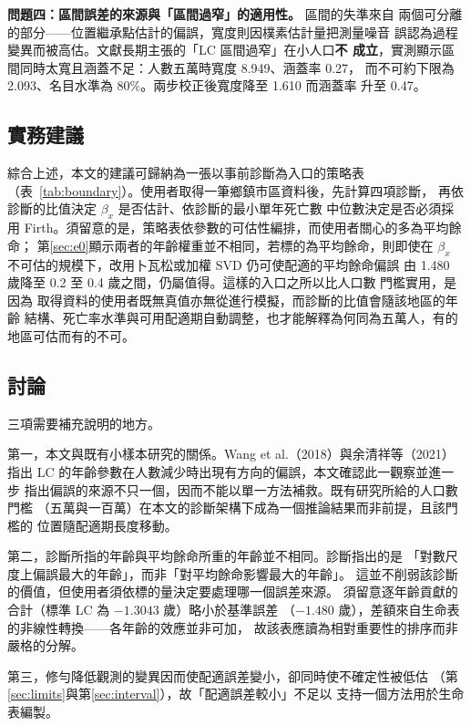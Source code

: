 \documentclass[UTF8, fontset=macnew, a4paper, 12pt]{ctexart}
\newcommand{\cn}[1]{\ding{\number\numexpr171+#1\relax}}
\begin{document}
\textbf{問題四：區間誤差的來源與「區間過窄」的適用性。} 區間的失準來自
兩個可分離的部分——位置繼承點估計的偏誤，寬度則因樸素估計量把測量噪音
誤認為過程變異而被高估。文獻長期主張的「LC 區間過窄」在小人口\textbf{不
成立}，實測顯示區間同時太寬且涵蓋不足：人數五萬時寬度 8.949、涵蓋率 0.27，
而不可約下限為 2.093、名目水準為 80\%。兩步校正後寬度降至 1.610 而涵蓋率
升至 0.47。


\subsection{實務建議}

綜合上述，本文的建議可歸納為一張以事前診斷為入口的策略表
（表~\ref{tab:boundary}）。使用者取得一筆鄉鎮市區資料後，先計算四項診斷，
再依診斷\cn{4}的比值決定 $\beta_x$ 是否估計、依診斷\cn{1}的最小單年死亡數
中位數決定是否必須採用 Firth。須留意的是，策略表依參數的可估性編排，而使用者關心的多為平均餘命；
第\ref{sec:e0}顯示兩者的年齡權重並不相同，若標的為平均餘命，則即使在
$\beta_x$ 不可估的規模下，改用卜瓦松或加權 SVD 仍可使配適的平均餘命偏誤
由 1.480 歲降至 0.2 至 0.4 歲之間，仍屬值得。這樣的入口之所以比人口數
門檻實用，是因為
取得資料的使用者既無真值亦無從進行模擬，而診斷的比值會隨該地區的年齡
結構、死亡率水準與可用配適期自動調整，也才能解釋為何同為五萬人，有的
地區可估而有的不可。


\subsection{討論}

三項需要補充說明的地方。

第一，本文與既有小樣本研究的關係。Wang et al.（2018）與余清祥等（2021）
指出 LC 的年齡參數在人數減少時出現有方向的偏誤，本文確認此一觀察並進一步
指出偏誤的來源不只一個，因而不能以單一方法補救。既有研究所給的人口數門檻
（五萬與一百萬）在本文的診斷架構下成為一個推論結果而非前提，且該門檻的
位置隨配適期長度移動。

第二，診斷所指的年齡與平均餘命所重的年齡並不相同。診斷\cn{2}指出的是
「對數尺度上偏誤最大的年齡」，而非「對平均餘命影響最大的年齡」。
這並不削弱該診斷的價值，但使用者須依標的量決定要處理哪一個誤差來源。
須留意逐年齡貢獻的合計（標準 LC 為 $-1.3043$ 歲）略小於基準誤差
（$-1.480$ 歲），差額來自生命表的非線性轉換——各年齡的效應並非可加，
故該表應讀為相對重要性的排序而非嚴格的分解。

第三，修勻降低觀測的變異因而使配適誤差變小，卻同時使不確定性被低估
（第\ref{sec:limits}與第\ref{sec:interval}），故「配適誤差較小」不足以
支持一個方法用於生命表編製。
\end{document}
